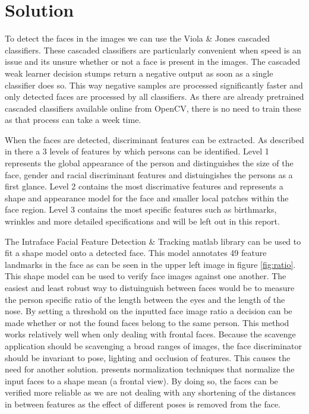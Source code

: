\documentclass[10pt,a4paper,twocolumn]{article}
\begin{document}
\section{Solution}
\label{sec:solution}

To detect the faces in the images we can use the Viola \& Jones cascaded classifiers. These cascaded classifiers are particularly convenient when speed is an issue and its unsure whether or not a face is present in the images. The cascaded weak learner decision stumps return a negative output as soon as a single classifier does so. This way negative samples are processed significantly faster and only detected faces are processed by all classifiers. As there are already pretrained cascaded classifiers available online from OpenCV, there is no need to train these as that process can take a week time.  

When the faces are detected, discriminant features can be extracted. As described in \cite{klare2010taxonomy} there a 3 levels of features by which persons can be identified. Level 1 represents the global appearance of the person and distinguishes the size of the face, gender and racial discriminant features and distuingishes the persons as a first glance. Level 2 contains the most discrimative features and represents a shape and appearance model for the face and smaller local patches within the face region. Level 3 contains the most specific features such as birthmarks, wrinkles and more detailed specifications and will be left out in this report. 

The Intraface Facial Feature Detection \& Tracking matlab library can be used to fit a shape model onto a detected face. This model annotates 49 feature landmarks in the face as can be seen in the upper left image in figure \ref{fig:ratio}. This shape model can be used to verify face images against one another. 
The easiest and least robust way to distuinguish between faces would be to measure the person specific ratio of the length between the eyes and the length of the nose. By setting a threshold on the inputted face image ratio a decision can be made whether or not the found faces belong to the same person. This method works relatively well when only dealing with frontal faces. Because the scavenge application should be scavenging a broad ranges of images, the face discriminator should be invariant to pose, lighting and occlusion of features. This causes the need for another solution. \cite{gao2009normalization} presents normalization techniques that normalize the input faces to a shape mean (a frontal view). By doing so, the faces can be verified more reliable as we are not dealing with any shortening of the distances in between features as the effect of different poses is removed from the face.  
\end{document}
